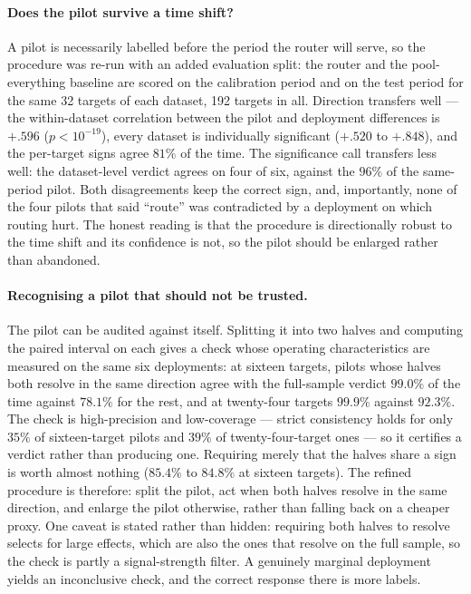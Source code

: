 \paragraph{Does the pilot survive a time shift?} A pilot is necessarily labelled
before the period the router will serve, so the procedure was re-run with an
added evaluation split: the router and the pool-everything baseline are scored
on the calibration period and on the test period for the same 32 targets of each
dataset, 192 targets in all. Direction transfers well --- the within-dataset
correlation between the pilot and deployment differences is $+.596$
($p<10^{-19}$), every dataset is individually significant ($+.520$ to $+.848$),
and the per-target signs agree $81\%$ of the time. The significance call
transfers less well: the dataset-level verdict agrees on four of six, against
the $96\%$ of the same-period pilot. Both disagreements keep the correct sign,
and, importantly, none of the four pilots that said ``route'' was contradicted
by a deployment on which routing hurt. The honest reading is that the procedure
is directionally robust to the time shift and its confidence is not, so the
pilot should be enlarged rather than abandoned.

\paragraph{Recognising a pilot that should not be trusted.} The pilot can be
audited against itself. Splitting it into two halves and computing the paired
interval on each gives a check whose operating characteristics are measured on
the same six deployments: at sixteen targets, pilots whose halves both resolve in
the same direction agree with the full-sample verdict $99.0\%$ of the time
against $78.1\%$ for the rest, and at twenty-four targets $99.9\%$ against
$92.3\%$. The check is high-precision and low-coverage --- strict consistency
holds for only $35\%$ of sixteen-target pilots and $39\%$ of twenty-four-target
ones --- so it certifies a verdict rather than producing one. Requiring merely
that the halves share a sign is worth almost nothing ($85.4\%$ to $84.8\%$ at
sixteen targets). The refined procedure is therefore: split the pilot, act when
both halves resolve in the same direction, and enlarge the pilot otherwise,
rather than falling back on a cheaper proxy. One caveat is stated rather than
hidden: requiring both halves to resolve selects for large effects, which are
also the ones that resolve on the full sample, so the check is partly a
signal-strength filter. A genuinely marginal deployment yields an inconclusive
check, and the correct response there is more labels.

